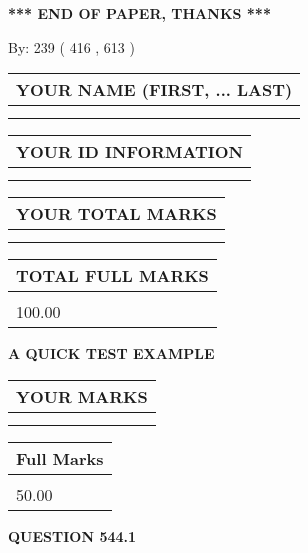 \documentclass[12pt]{article}
\begin{document}
\vspace{1.0in} 
{\textbf{\large{ *** END OF PAPER, THANKS *** }}} 
   
   
\hspace{1.0in} By: 
 239 ( 416 ,  613 )
   
   
   
   
\newpage 
\setcounter{page}{ 
   544001 } 
   
   
   
   
\noindent\begin{tabular}{|l|}
\hline
YOUR NAME (FIRST, ... LAST)  \\
\hline
 \\ 
 \\ 
\hline
\end{tabular}
\hspace{0.05in} \begin{tabular}{|l|}
\hline
 YOUR   ID   INFORMATION  \\
\hline
 \\ 
 \\ 
\hline
\end{tabular}
   
   
\vspace{0.2in}\noindent\begin{tabular}{|l|}
\hline
YOUR TOTAL MARKS  \\
\hline
 \\ 
 \\ 
\hline
\end{tabular}
\hspace{0.05in} \begin{tabular}{|l|}
\hline
TOTAL FULL MARKS  \\
\hline
 \\ 
100.00 \\
\hline
\end{tabular}
   
   
 \vspace{0.2in}
{\LARGE {\textbf{ A QUICK TEST EXAMPLE}}}
   
   
  
\vspace{0.2in}
  
\noindent\begin{tabular}{|l|}
\hline
 YOUR MARKS  \\
\hline
 \\ 
 \\ 
\hline
\end{tabular}
\hspace{0.05in} \begin{tabular}{|l|}
\hline
 Full Marks  \\
\hline
 \\ 
50.00 \\
\hline
\end{tabular}
{\textbf{\Large{QUESTION
544.1 
}}}
  
\end{document}
